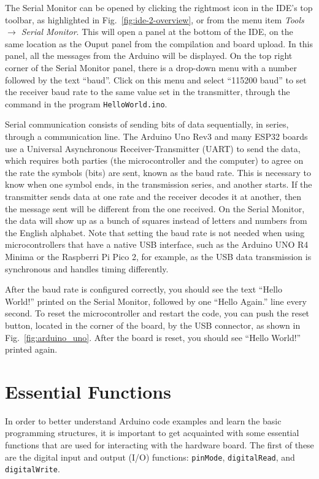 The Serial Monitor can be opened by clicking the rightmost icon in the IDE's top toolbar, as highlighted in Fig.~\ref{fig:ide-2-overview}, or from the menu item \emph{Tools $\to$ Serial Monitor}.
This will open a panel at the bottom of the IDE, on the same location as the Ouput panel from the compilation and board upload.
In this panel, all the messages from the Arduino will be displayed.
On the top right corner of the Serial Monitor panel, there is a drop-down menu with a number followed by the text ``baud''.
Click on this menu and select ``115200 baud'' to set the receiver baud rate to the same value set in the transmitter, through the command  in the program \texttt{HelloWorld.ino}.

Serial communication consists of sending bits of data sequentially, in series, through a communication line.
The Arduino Uno Rev3 and many ESP32 boards use a Universal Asynchronous Receiver-Transmitter (UART) to send the data, which requires both parties (the microcontroller and the computer) to agree on the rate the symbols (bits) are sent, known as the baud rate.
This is necessary to know when one symbol ends, in the transmission series, and another starts.
If the transmitter sends data at one rate and the receiver decodes it at another, then the message sent will be different from the one received.
On the Serial Monitor, the data will show up as a bunch of squares instead of letters and numbers from the English alphabet.
Note that setting the baud rate is not needed when using microcontrollers that have a native USB interface, such as the Arduino UNO R4 Minima or the Raspberri Pi Pico 2, for example, as the USB data transmission is synchronous and handles timing differently.

After the baud rate is configured correctly, you should see the text ``Hello World!'' printed on the Serial Monitor, followed by one ``Hello Again.'' line every second.
To reset the microcontroller and restart the code, you can push the reset button, located in the corner of the board, by the USB connector, as shown in Fig.~\ref{fig:arduino_uno}.
After the board is reset, you should see ``Hello World!'' printed again.

\section{Essential Functions}
In order to better understand Arduino code examples and learn the basic programming structures, it is important to get acquainted with some essential functions that are used for interacting with the hardware board.
The first of these are the digital input and output (I/O) functions: \texttt{pinMode}, \texttt{digitalRead}, and \texttt{digitalWrite}.

